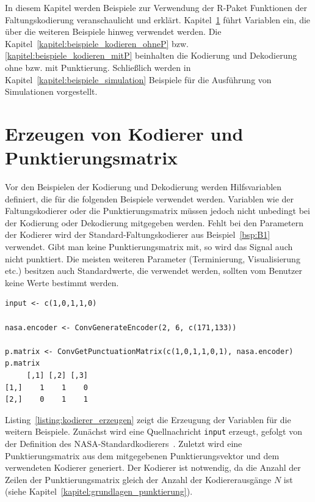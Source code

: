 In diesem Kapitel werden Beispiele zur Verwendung der R-Paket Funktionen der Faltungskodierung veranschaulicht und erklärt. Kapitel~\ref{kapitel:beispiele_kodierer} führt Variablen ein, die über die weiteren Beispiele hinweg verwendet werden. Die Kapitel~\ref{kapitel:beispiele_kodieren_ohneP} bzw. \ref{kapitel:beispiele_kodieren_mitP} beinhalten die Kodierung und Dekodierung ohne bzw. mit Punktierung. Schließlich werden in Kapitel~\ref{kapitel:beispiele_simulation} Beispiele für die Ausführung von Simulationen vorgestellt. 

\section{Erzeugen von Kodierer und Punktierungsmatrix}
\label{kapitel:beispiele_kodierer}
Vor den Beispielen der Kodierung und Dekodierung werden Hilfsvariablen definiert, die für die folgenden Beispiele verwendet werden. Variablen wie der Faltungskodierer oder die Punktierungsmatrix müssen jedoch nicht unbedingt bei der Kodierung oder Dekodierung mitgegeben werden. Fehlt bei den Parametern der Kodierer wird der Standard-Faltungskodierer aus Beispiel~\ref{bsp:B1} verwendet. Gibt man keine Punktierungsmatrix mit, so wird das Signal auch nicht punktiert. Die meisten weiteren Parameter (Terminierung, Visualisierung etc.) besitzen auch Standardwerte, die verwendet werden, sollten vom Benutzer keine Werte bestimmt werden.
\begin{lstlisting}[caption=Erzeugung von Kodierer und Punktierungsmatrix, label={listing:kodierer_erzeugen}, float=!th]
input <- c(1,0,1,1,0)
 
nasa.encoder <- ConvGenerateEncoder(2, 6, c(171,133))

p.matrix <- ConvGetPunctuationMatrix(c(1,0,1,1,0,1), nasa.encoder)
p.matrix
     [,1] [,2] [,3]
[1,]    1    1    0
[2,]    0    1    1
\end{lstlisting}
Listing~\ref{listing:kodierer_erzeugen} zeigt die Erzeugung der Variablen für die weitern Beispiele. Zunächst wird eine Quellnachricht \texttt{input} erzeugt, gefolgt von der Definition des NASA-Standardkodierers~\cite[S. 90]{morelos2006art}. Zuletzt wird eine Punktierungsmatrix aus dem mitgegebenen Punktierungsvektor und dem verwendeten Kodierer generiert. Der Kodierer ist notwendig, da die Anzahl der Zeilen der Punktierungsmatrix gleich der Anzahl der Kodiererausgänge $N$ ist (siehe Kapitel~\ref{kapitel:grundlagen_punktierung}).

